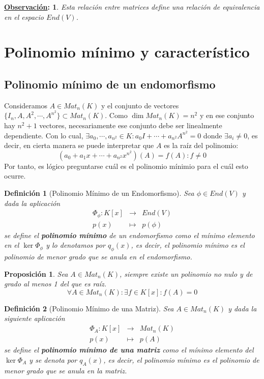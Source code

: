 \documentclass[10pt,a4paper,openright]{book}
\theoremstyle{break}
\newtheorem*{defi}{Definición}
\newtheorem*{prop}{Proposición}
\newtheorem*{obs}{\underline{Observación}:}
\begin{document}
\begin{obs}
Esta relación entre matrices define una relación de equivalencia en el espacio $End(V)$.
\end{obs}

\section{Polinomio mínimo y característico}
\subsection{Polinomio mínimo de un endomorfismo}
Consideramos $A\in Mat_n(K)$ y el conjunto de vectores $\{I_n, A, A^2, \cdots, A^{n^2}\}\subset Mat_n(K)$. Como $\dim Mat_n(K)= n^2$ y en ese conjunto hay $n^2+1$ vectores, necesariamente ese conjunto debe ser linealmente dependiente. Con lo cual, $\exists a_0, \cdots, a_{n^2}\in K: a_0I+\cdots+a_{n^2}A^{n^2}=0$ donde $\exists a_i \neq 0$, es decir, en cierta manera se puede interpretar que $A$ es la raíz del polinomio:
$$(a_0+a_1x+\cdots+a_{n^2}x^{n^2})(A)=f(A): f\neq 0$$
Por tanto, es lógico preguntarse cuál es el polinomio mínimio para el cuál esto ocurre.

\begin{defi}[Polinomio Mínimo de un Endomorfismo]
Sea $\phi \in End(V)$ y dada la aplicación
\begin{eqnarray*}
\Phi_\phi:K[x] &\longrightarrow& End(V) \\ p(x) &\longmapsto& p(\phi) 
\end{eqnarray*}
se define el \textbf{polinomio mínimo} de un endomorfismo como el mínimo elemento en el $\ker \Phi_\phi$ y lo denotamos por $q_\phi(x)$, es decir, el polinomio mínimo es el polinomio de menor grado que se anula en el endomorfismo.
\end{defi}

\begin{prop}
Sea $A\in Mat_n(K)$, siempre existe un polinomio no nulo y de grado al menos 1 del que es raíz.
$$\forall A\in Mat_n(K): \exists f\in K[x]: f(A)=0$$
\end{prop}

\begin{defi}[Polinomio Mínimo de una Matriz]
Sea $A\in Mat_n(K)$ y dada la siguiente aplicación
\begin{eqnarray*}
\Phi_A:K[x] &\longrightarrow& Mat_n(K) \\ p(x) &\longmapsto& p(A) 
\end{eqnarray*}
se define el \textbf{polinomio mínimo de una matriz} como el mínimo elemento del $\ker \Phi_A$ y se denota por $q_A(x)$, es decir, el polinomio mínimo es el polinomio de menor grado que se anula en la matriz.
\end{defi}
\end{document}
